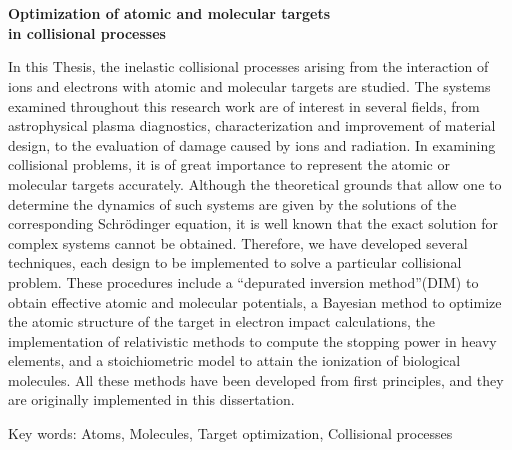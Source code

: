 \chapter*{}%
%

\begin{center}
\begin{large}
\textbf{Optimization of atomic and molecular targets \\ in collisional processes}
\end{large}
\end{center}

\vspace{1.5cm}
In this Thesis, the inelastic collisional processes arising from the 
interaction of ions and electrons with atomic and molecular targets are 
studied. The systems examined throughout this research work are of 
interest in several fields, from astrophysical plasma diagnostics, 
characterization and improvement of material design, to the evaluation 
of damage caused by ions and radiation. In examining collisional 
problems, it is of great importance to represent the atomic or 
molecular targets accurately. Although the theoretical grounds that 
allow one to determine the dynamics of such systems are given by the 
solutions of the corresponding Schrödinger equation, it is well known 
that the exact solution for complex systems cannot be obtained. 
Therefore, we have developed several techniques, each design to be 
implemented to solve a particular collisional problem. These procedures 
include a “depurated inversion method”(DIM) to obtain effective atomic 
and molecular potentials, a Bayesian method to optimize the atomic 
structure of the target in electron impact calculations, the 
implementation of relativistic methods to compute the stopping power in 
heavy elements, and a stoichiometric model to attain the ionization of 
biological molecules. All these methods have been developed from first 
principles, and they are originally implemented in this dissertation.

\vspace{1cm}
\noindent
Key words: 
Atoms, 
Molecules, 
Target optimization, 
Collisional processes


